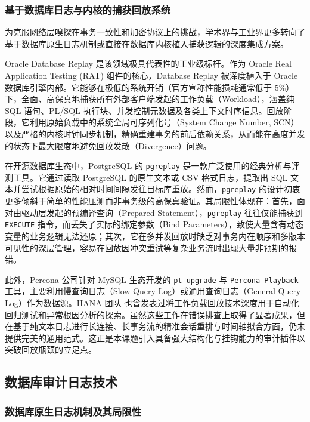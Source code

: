 \subsubsection{基于数据库日志与内核的捕获回放系统}

为克服网络层嗅探在事务一致性和加密协议上的挑战，学术界与工业界更多转向了基于数据库原生日志机制或直接在数据库内核植入捕获逻辑的深度集成方案。

Oracle Database Replay\cite{OracleDatabaseReplay} 是该领域极具代表性的工业级标杆。作为 Oracle Real Application Testing (RAT) 组件的核心，Database Replay 被深度植入于 Oracle 数据库引擎内部。它能够在极低的系统开销（官方宣称性能损耗通常低于 5\%）下，全面、高保真地捕获所有外部客户端发起的工作负载（Workload），涵盖纯 SQL 语句、PL/SQL 执行块、并发控制元数据及各类上下文时序信息。回放阶段，它利用原始负载中的系统全局可序列化号（System Change Number, SCN）以及严格的内核时钟同步机制\cite{OracleReplayVLDB}，精确重建事务的前后依赖关系，从而能在高度并发的状态下最大限度地避免回放发散（Divergence）问题。

在开源数据库生态中，PostgreSQL 的 \texttt{pgreplay}\cite{pgreplay} 是一款广泛使用的经典分析与评测工具。它通过读取 PostgreSQL 的原生文本或 CSV 格式日志，提取出 SQL 文本并尝试根据原始的相对时间间隔发往目标库重放。然而，\texttt{pgreplay} 的设计初衷更多倾斜于简单的性能压测而非事务级的高保真验证。其局限性体现在：首先，面对由驱动层发起的预编译查询（Prepared Statement），\texttt{pgreplay} 往往仅能捕获到 \texttt{EXECUTE} 指令，而丢失了实际的绑定参数（Bind Parameters），致使大量含有动态变量的业务逻辑无法还原；其次，它在多并发回放时缺乏对事务内在顺序和多版本可见性的深层管理，容易在回放因冲突重试等复杂业务流时出现大量非预期的报错。

此外，Percona 公司针对 MySQL 生态开发的 \texttt{pt-upgrade}\cite{ptupgrade} 与 \texttt{Percona Playback} 工具，主要利用慢查询日志（Slow Query Log）或通用查询日志（General Query Log）作为数据源。HANA 团队\cite{SAPHANAWorkloadReplay} 也曾发表过将工作负载回放技术深度用于自动化回归测试和异常根因分析的探索。虽然这些工作在错误排查上取得了显著成果，但在基于纯文本日志进行长连接、长事务流的精准会话重排与时间轴拟合方面，仍未提供完美的通用范式。这正是本课题引入具备强大结构化与挂钩能力的审计插件以突破回放瓶颈的立足点。

\subsection{数据库审计日志技术}

\subsubsection{数据库原生日志机制及其局限性}

